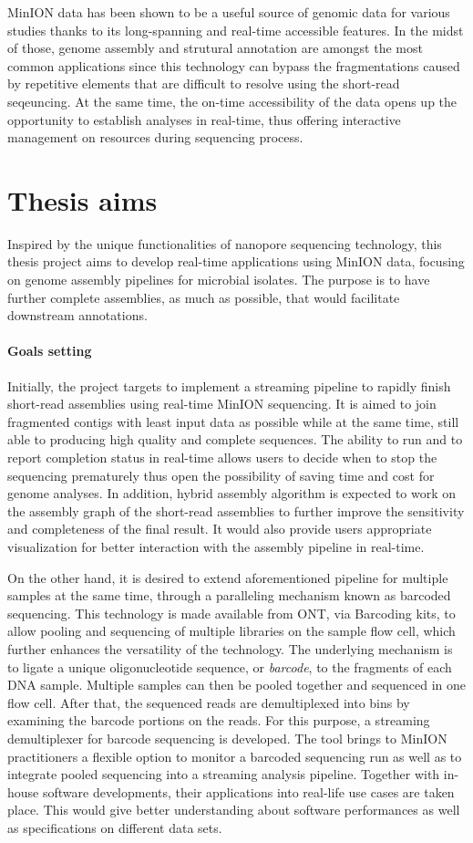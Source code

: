 MinION data has been shown to be a useful source of genomic data for various  studies thanks to its long-spanning and real-time accessible features. In the midst of those, genome assembly and strutural annotation are amongst the most common applications since this technology can bypass the fragmentations caused by repetitive elements that are difficult to resolve using the short-read seqeuncing. At the same time, the on-time accessibility of the data opens up the opportunity to establish  analyses in real-time, thus offering interactive management on resources during sequencing process.
\section{Thesis aims}
Inspired by the unique functionalities of nanopore sequencing technology, this thesis project aims to  develop real-time applications using MinION data, focusing on genome assembly pipelines for microbial isolates. The purpose is to have further complete assemblies, as much as possible, that would facilitate downstream annotations.

\paragraph{Goals setting} Initially, the project targets to implement a streaming pipeline to rapidly finish short-read assemblies using real-time MinION sequencing. 
It is aimed to join fragmented contigs with least input data as possible while at the same time, still able to producing high quality and complete sequences. 
The ability to run and to report completion status in real-time allows users to decide when to stop the sequencing prematurely thus open the possibility of saving time and cost for genome analyses.
In addition, hybrid assembly algorithm is expected to work on the assembly graph of the short-read assemblies to further improve the sensitivity and completeness of the final result. It would also provide users appropriate visualization for better interaction with the assembly pipeline in real-time.

On the other hand, it is desired to extend aforementioned pipeline for multiple samples at the same time, through a paralleling mechanism known as barcoded sequencing.
This technology is made available from ONT, via Barcoding kits, to allow pooling and sequencing of multiple libraries on the sample flow cell, which further enhances the versatility of the technology. The underlying mechanism is to ligate a unique oligonucleotide sequence, or \emph{barcode}, to the fragments of each DNA sample. Multiple samples can then be pooled together and sequenced in one flow cell. After that, the sequenced reads are demultiplexed into bins by examining the barcode portions on the reads. 
For this purpose, a streaming demultiplexer for barcode sequencing is developed.
The tool brings to MinION practitioners a flexible option to monitor a barcoded sequencing run as well as to integrate pooled sequencing into a streaming analysis pipeline.
Together with in-house software developments, their applications into real-life use cases are taken place. This would give better understanding about software performances as well as specifications on different data sets.

